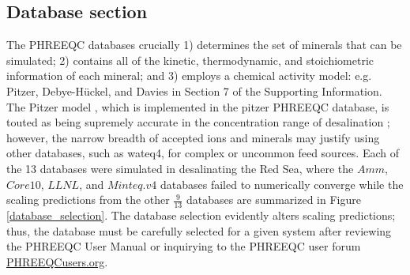 \subsection{Database section}
The PHREEQC databases crucially 1) determines the set of minerals that can be simulated; 2) contains all of the kinetic, thermodynamic, and stoichiometric information of each mineral; and 3) employs a chemical activity model: e.g. Pitzer, Debye-H\"uckel, and Davies in Section 7 of the Supporting Information. The Pitzer model \cite{Pitzer1973ThermodynamicsEquations,Pitzer1974ThermodynamicsElectrolytes}, which is implemented in the pitzer PHREEQC database, is touted as being supremely accurate in the concentration range of desalination \cite{VandeLisdonk2001PredictionSystems,Sheikholeslami2004AssessmentUnits,Mohammad2007PredictionMembranes}; however, the narrow breadth of accepted ions and minerals may justify using other databases, such as wateq4, for complex or uncommon feed sources. Each of the 13 databases were simulated in desalinating the Red Sea, where the $Amm$, $Core10$, $LLNL$, and $Minteq.v4$ databases failed to numerically converge while the scaling predictions from the other $\frac{9}{13}$ databases are summarized in Figure \ref{database_selection}. The database selection evidently alters scaling predictions; thus, the database must be carefully selected for a given system after reviewing the PHREEQC User Manual or inquirying to the PHREEQC user forum \url{PHREEQCusers.org}.

